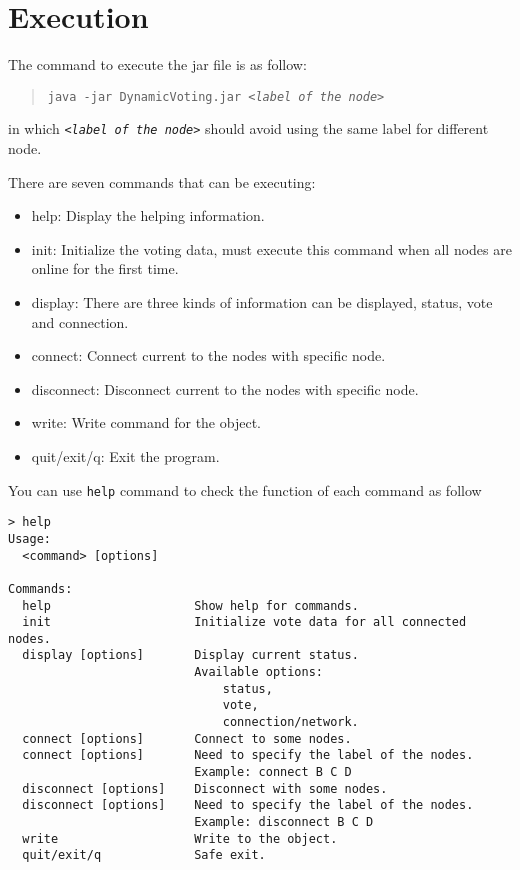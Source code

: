 \documentclass[12pt,letterpaper,en-US]{article}
\begin{document}
\section{Execution}

The command to execute the jar file is as follow:
\begin{quote}
\texttt{java -jar DynamicVoting.jar \emph{<label of the node>}}
\end{quote}
in which \emph{\texttt{<label of the node>}} should avoid using the same label for different node.

There are seven commands that can be executing:
\begin{itemize}
    \item help: Display the helping information.
    \item init: Initialize the voting data, must execute this command when all nodes are online for the first time.
    \item display: There are three kinds of information can be displayed, status, vote and connection.
    \item connect: Connect current to the nodes with specific node.
    \item disconnect: Disconnect current to the nodes with specific node.
    \item write: Write command for the object.
    \item quit/exit/q: Exit the program.
\end{itemize}

You can use \texttt{help} command to check the function of each command as follow
\begin{lstlisting}
> help
Usage:
  <command> [options]

Commands:
  help                    Show help for commands.
  init                    Initialize vote data for all connected nodes.
  display [options]       Display current status.
                          Available options:
                              status,
                              vote,
                              connection/network.
  connect [options]       Connect to some nodes.
  connect [options]       Need to specify the label of the nodes.
                          Example: connect B C D
  disconnect [options]    Disconnect with some nodes.
  disconnect [options]    Need to specify the label of the nodes.
                          Example: disconnect B C D
  write                   Write to the object.
  quit/exit/q             Safe exit.
\end{lstlisting}
\end{document}

